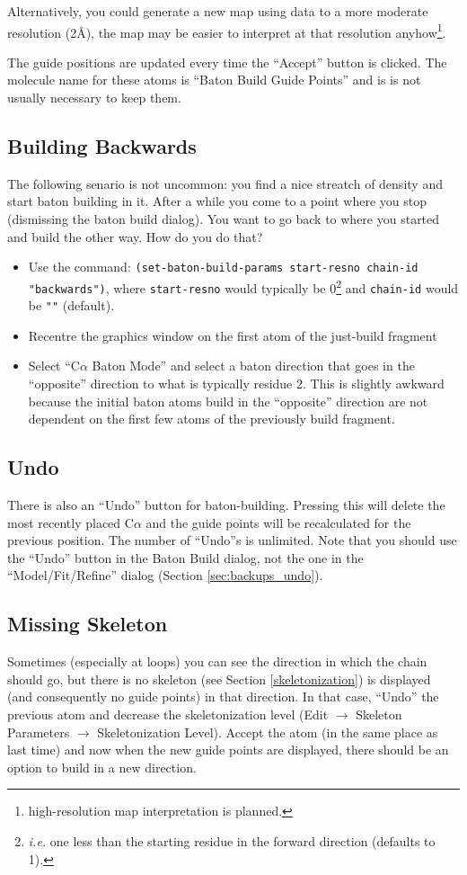 \documentclass{book}
\begin{document}
Alternatively, you could generate a new map using data
to a more moderate resolution (2\AA), the map may be easier to
interpret at that resolution anyhow\footnote{high-resolution map
  interpretation is planned.}.

The guide positions are updated every time the ``Accept'' button is
clicked.  The molecule name for these atoms is ``Baton Build Guide Points''
and is is not usually necessary to keep them.

\subsection{Building Backwards}
The following senario is not uncommon: you find a nice streatch of
density and start baton building in it.  After a while you come to a
point where you stop (dismissing the baton build dialog).  You want to
go back to where you started and build the other way.  How do you do
that?

\begin{itemize}
\item Use the command: \texttt{(set-baton-build-params start-resno
    chain-id "backwards")}, where \texttt{start-resno} would typically
  be 0\footnote{\emph{i.e.} one less than the starting residue in the
    forward direction (defaults to 1).} and \texttt{chain-id} would be
  \texttt{""} (default).
\item Recentre the graphics window on the first atom of the just-build
  fragment
\item Select ``C$\alpha$ Baton Mode'' and select a baton direction
  that goes in the ``opposite'' direction to what is typically residue
  2.  This is slightly awkward because the initial baton atoms build
  in the ``opposite'' direction are not dependent on the first few
  atoms of the previously build fragment.
\end{itemize}


\subsection{Undo}
There is also an ``Undo'' button for baton-building.  Pressing this
will delete the most recently placed C$\alpha$ and the guide points
will be recalculated for the previous position.  The number of
``Undo''s is unlimited.  Note that you should use the ``Undo'' button
in the Baton Build dialog, not the one in the ``Model/Fit/Refine''
dialog (Section \ref{sec:backups_undo}).

\subsection{Missing Skeleton}
Sometimes (especially at loops) you can see
the direction in which the chain should go, but there is no skeleton
(see Section \ref{skeletonization}) is displayed (and consequently no
guide points) in that direction. In that case, ``Undo'' the previous
atom and decrease the skeletonization level (\textsf{Edit
  $\rightarrow$ Skeleton Parameters $\rightarrow$ Skeletonization
  Level}).  Accept the atom (in the same place as last time) and now
when the new guide points are displayed, there should be an option to
build in a new direction.
\end{document}
